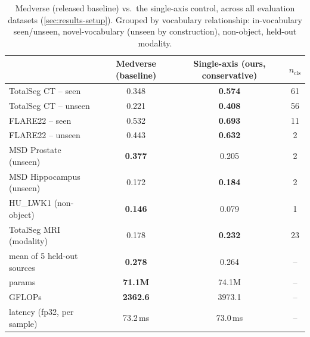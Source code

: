 \begin{table}[t]
  \centering
  \small
  \caption{Medverse (released baseline) vs.\ the single-axis control, across all evaluation
  datasets (\autoref{sec:results-setup}). Grouped by vocabulary relationship: in-vocabulary
  seen/unseen, novel-vocabulary (unseen by construction), non-object, held-out modality.}
  \label{tab:fusion-medverse}
  \begin{tabular}{lccc}
    \toprule
     & Medverse (baseline) & Single-axis (ours, conservative) & $n_\text{cls}$ \\
    \midrule
    TotalSeg CT -- seen      & 0.348 & \textbf{0.574} & 61 \\
    TotalSeg CT -- unseen    & 0.221 & \textbf{0.408} & 56 \\
    FLARE22 -- seen          & 0.532 & \textbf{0.693} & 11 \\
    FLARE22 -- unseen        & 0.443 & \textbf{0.632} & 2  \\
    \midrule
    MSD Prostate (unseen)    & \textbf{0.377} & 0.205 & 2 \\
    MSD Hippocampus (unseen) & 0.172 & \textbf{0.184} & 2 \\
    \midrule
    HU\_LWK1 (non-object)    & \textbf{0.146} & 0.079 & 1 \\
    \midrule
    TotalSeg MRI (modality)  & 0.178 & \textbf{0.232} & 23 \\
    \midrule
    mean of 5 held-out sources & \textbf{0.278} & 0.264 & -- \\
    \midrule
    params    & \textbf{71.1M}  & 74.1M   & -- \\
    GFLOPs    & \textbf{2362.6} & 3973.1  & -- \\
    latency (fp32, per sample) & 73.2\,ms & 73.0\,ms & -- \\
    \bottomrule
  \end{tabular}
\end{table}

